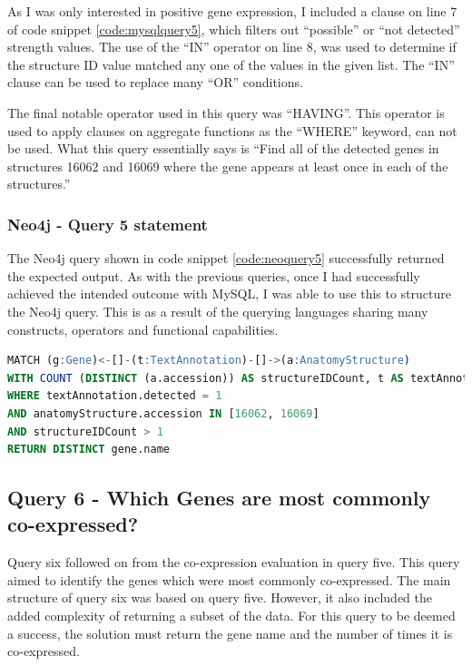 As I was only interested in positive gene expression, I included a clause on line 7 of code snippet \ref{code:mysqlquery5}, which filters out ``possible'' or ``not detected'' strength values. The use of the ``IN'' operator on line 8, was used to determine if the structure ID value matched any one of the values in the given list. The ``IN'' clause can be used to replace many ``OR'' conditions.

The final notable operator used in this query was ``HAVING''. This operator is used to apply clauses on aggregate functions as the ``WHERE'' keyword, can not be used. What this query essentially says is ``Find all of the detected genes in structures 16062 and 16069 where the gene appears at least once in each of the structures.''

\subsubsection*{Neo4j - Query 5 statement}\label{neoquery5statement}
The Neo4j query shown in code snippet \ref{code:neoquery5} successfully returned the expected output. As with the previous queries, once I had successfully achieved the intended outcome with MySQL, I was able to use this to structure the Neo4j query. This is as a result of the querying languages sharing many constructs, operators and functional capabilities.

\begin{lstlisting}[language=SQL, caption=Neo4j query 5 statement. Which Genes are stored in structures X and Y?., label=code:neoquery5]
MATCH (g:Gene)<-[]-(t:TextAnnotation)-[]->(a:AnatomyStructure)
WITH COUNT (DISTINCT (a.accession)) AS structureIDCount, t AS textAnnotation, a AS anatomyStructure, g AS gene
WHERE textAnnotation.detected = 1
AND anatomyStructure.accession IN [16062, 16069]
AND structureIDCount > 1
RETURN DISTINCT gene.name
\end{lstlisting}

\subsection*{Query 6 - Which Genes are most commonly co-expressed?}\label{query6}
Query six followed on from the co-expression evaluation in query five. This query aimed to identify the genes which were most commonly co-expressed. The main structure of query six was based on query five. However, it also included the added complexity of returning a subset of the data. For this query to be deemed a success, the solution must return the gene name and the number of times it is co-expressed. 

